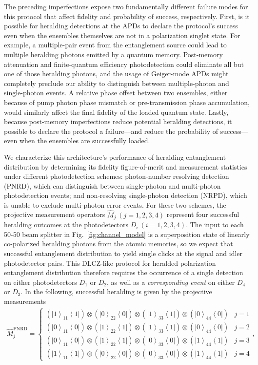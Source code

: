 \documentclass[aps,twocolumn,secnumarabic,amsmath,amssymb,pra,groupedaddress,
showpacs, showkeys]{revtex4-1}
\newcommand{\bra}[1]{\left\langle #1 \right|}
\newcommand{\ket}[1]{\left|#1\right\rangle}
\newcommand{\pna}[1]{\left(#1\right)}
\begin{document}
The preceding imperfections expose two fundamentally different failure modes
for this protocol that affect fidelity and probability of success,
respectively. First, is it possible for heralding detections at the APDs to
declare the protocol's success even when the ensembles themselves are not in a
polarization singlet state. For example, a multiple-pair event from the
entanglement source could lead to multiple heralding photons emitted by a
quantum memory. Post-memory attenuation and finite-quantum efficiency
photodetection could eliminate all but one of those heralding photons, and the
usage of Geiger-mode APDs might completely preclude our ability to distinguish
between multiple-photon and single-photon events. A relative phase offset
between two ensembles, either because of pump photon phase mismatch or
pre-transmission phase accumulation, would similarly affect the final fidelity
of the loaded quantum state. Lastly, because post-memory imperfections reduce
potential heralding detections, it possible to declare the protocol a
failure---and reduce the probability of success---even when the ensembles are
successfully loaded.

We characterize this architecture's performance of heralding entanglement
distribution by determining its fidelity figure-of-merit and measurement
statistics under different photodetection schemes: photon-number resolving
detection (PNRD), which can distinguish between single-photon and multi-photon
photodetection events; and non-resolving single-photon detection (NRPD), which
is unable to exclude multi-photon error events. For these two schemes, the
projective measurement operators $\hat{M}_j~\pna{j=1,2,3,4}$ represent four
successful heralding outcomes at the photodetectors $D_i~\pna{i=1,2,3,4}$. The
input to each 50-50 beam splitter in Fig.~\ref{fig:channel_model} is a
superposition state of linearly co-polarized heralding photons from the atomic
memories, so we expect that successful entanglement distribution to yield
single clicks at the signal and idler photodetector pairs. This DLCZ-like
protocol for heralded polarization entanglement distribution therefore requires
the occurrence of a single detection on either photodetectors $D_1$ or $D_2$,
as well as a \emph{corresponding event} on either $D_4$ or $D_3$. In the
following, successful heralding is given by the projective measurements
\begin{align}
    \hat{M}_j^{\textrm{PNRD}} = \left\{
	\begin{array}{lr}
\pna{\ket{1}_{11}\bra{1}}\otimes\pna{\ket{0}_{22}\bra{0}}\otimes\pna{\ket{1}_{33}\bra{1}}\otimes\pna{\ket{0}_{44}\bra{0}} & j=1\\
\pna{\ket{0}_{11}\bra{0}}\otimes\pna{\ket{1}_{22}\bra{1}}\otimes\pna{\ket{1}_{33}\bra{1}}\otimes\pna{\ket{0}_{44}\bra{0}} & j=2\\
\pna{\ket{0}_{11}\bra{0}}\otimes\pna{\ket{1}_{22}\bra{1}}\otimes\pna{\ket{0}_{33}\bra{0}}\otimes\pna{\ket{1}_{44}\bra{1}} & j=3\\
\pna{\ket{1}_{11}\bra{1}}\otimes\pna{\ket{0}_{22}\bra{0}}\otimes\pna{\ket{0}_{33}\bra{0}}\otimes\pna{\ket{1}_{44}\bra{1}} & j=4
	\end{array}
	\right.,
\end{align}
\end{document}
